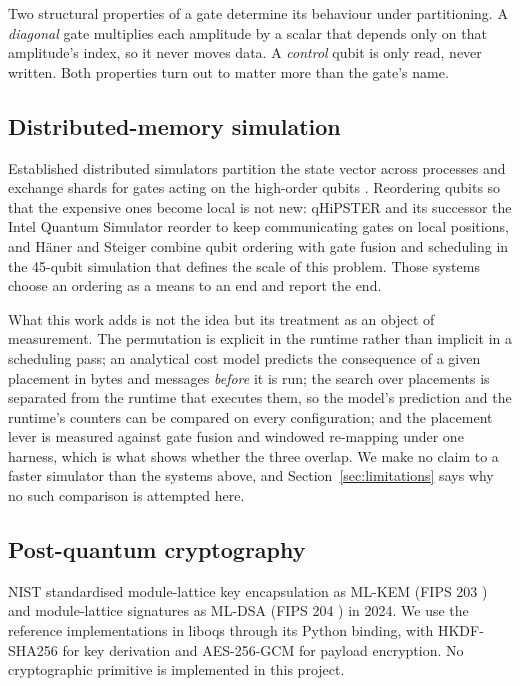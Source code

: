 \documentclass[11pt]{article}
\begin{document}
Two structural properties of a gate determine its behaviour under
partitioning. A \emph{diagonal} gate multiplies each amplitude by a scalar
that depends only on that amplitude's index, so it never moves data. A
\emph{control} qubit is only read, never written. Both properties turn out to
matter more than the gate's name.

\subsection{Distributed-memory simulation}

Established distributed simulators partition the state vector across
processes and exchange shards for gates acting on the high-order qubits
\cite{deraedt2007,quest2019,cuquantum}. Reordering qubits so that the
expensive ones become local is not new: qHiPSTER \cite{smelyanskiy2016} and
its successor the Intel Quantum Simulator \cite{guerreschi2020} reorder to
keep communicating gates on local positions, and H{\"a}ner and Steiger
\cite{haner2017} combine qubit ordering with gate fusion and scheduling in
the 45-qubit simulation that defines the scale of this problem. Those systems
choose an ordering as a means to an end and report the end.

What this work adds is not the idea but its treatment as an object of
measurement. The permutation is explicit in the runtime rather than implicit
in a scheduling pass; an analytical cost model predicts the consequence of a
given placement in bytes and messages \emph{before} it is run; the search over
placements is separated from the runtime that executes them, so the model's
prediction and the runtime's counters can be compared on every configuration;
and the placement lever is measured against gate fusion and windowed
re-mapping under one harness, which is what shows whether the three overlap.
We make no claim to a faster simulator than the systems above, and
Section~\ref{sec:limitations} says why no such comparison is attempted here.

\subsection{Post-quantum cryptography}

NIST standardised module-lattice key encapsulation as ML-KEM (FIPS 203
\cite{fips203}) and module-lattice signatures as ML-DSA (FIPS 204
\cite{fips204}) in 2024. We use the reference implementations in liboqs
\cite{liboqs} through its Python binding, with HKDF-SHA256 \cite{rfc5869} for
key derivation and AES-256-GCM \cite{sp800038d} for payload encryption. No
cryptographic primitive is implemented in this project.
\end{document}
